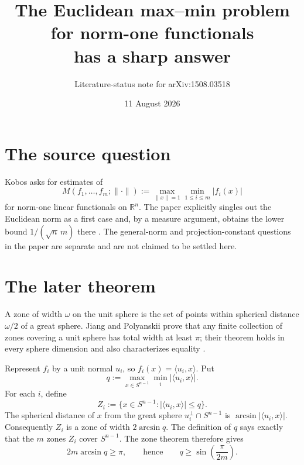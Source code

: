 \documentclass[11pt]{article}
\title{The Euclidean max--min problem for norm-one functionals\\has a sharp answer}
\author{Literature-status note for arXiv:1508.03518}
\date{11 August 2026}
\begin{document}
\maketitle

\begin{center}
\end{center}

\section*{The source question}

Kobos asks for estimates of
\[
 M(f_1,\ldots,f_m;\|\cdot\|)
 :=\max_{\|x\|=1}\min_{1\leq i\leq m}|f_i(x)|
\]
for norm-one linear functionals on $\mathbb R^n$.  The paper explicitly
singles out the Euclidean norm as a first case and, by a measure argument,
obtains the lower bound $1/(\sqrt n\,m)$ there
\cite[Section~3 and Problem~4]{source}.  The general-norm and
projection-constant questions in the paper are separate and are not claimed
to be settled here.

\section*{The later theorem}

A zone of width $\omega$ on the unit sphere is the set of points within
spherical distance $\omega/2$ of a great sphere.  Jiang and Polyanskii prove
that any finite collection of zones covering a unit sphere has total width at
least $\pi$; their theorem holds in every sphere dimension and also
characterizes equality \cite[Theorem~1]{zones}.

Represent $f_i$ by a unit normal $u_i$, so
$f_i(x)=\langle u_i,x\rangle$.  Put
\[
 q:=\max_{x\in S^{n-1}}\min_i|\langle u_i,x\rangle|.
\]
For each $i$, define
\[
 Z_i:=\{x\in S^{n-1}:|\langle u_i,x\rangle|\leq q\}.
\]
The spherical distance of $x$ from the great sphere
$u_i^\perp\cap S^{n-1}$ is
$\arcsin |\langle u_i,x\rangle|$.  Consequently $Z_i$ is a zone of
width $2\arcsin q$.  The definition of $q$ says exactly that the $m$ zones
$Z_i$ cover $S^{n-1}$.  The zone theorem therefore gives
\[
  2m\arcsin q\geq\pi,
  \qquad\text{hence}\qquad
  q\geq\sin\!\left(\frac{\pi}{2m}\right).
\]
\end{document}
